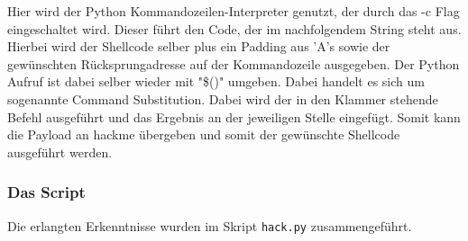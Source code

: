 \documentclass[12pt]{article}
\begin{document}
Hier wird der Python Kommandozeilen-Interpreter genutzt, der durch das -c Flag eingeschaltet wird. Dieser führt den Code, der im nachfolgendem String steht aus. Hierbei wird der Shellcode selber plus ein Padding aus 'A's sowie der gewünschten Rücksprungadresse auf der Kommandozeile ausgegeben. Der Python Aufruf ist dabei selber wieder mit "\$()" umgeben. Dabei handelt es sich um sogenannte Command Substitution. Dabei wird der in den Klammer stehende Befehl ausgeführt und das Ergebnis an der jeweiligen Stelle eingefügt. Somit kann die Payload an hackme übergeben und somit der gewünschte Shellcode ausgeführt werden. 

\subsubsection{Das Script}
Die erlangten Erkenntnisse wurden im Skript \texttt{hack.py} zusammengeführt.
\end{document}
